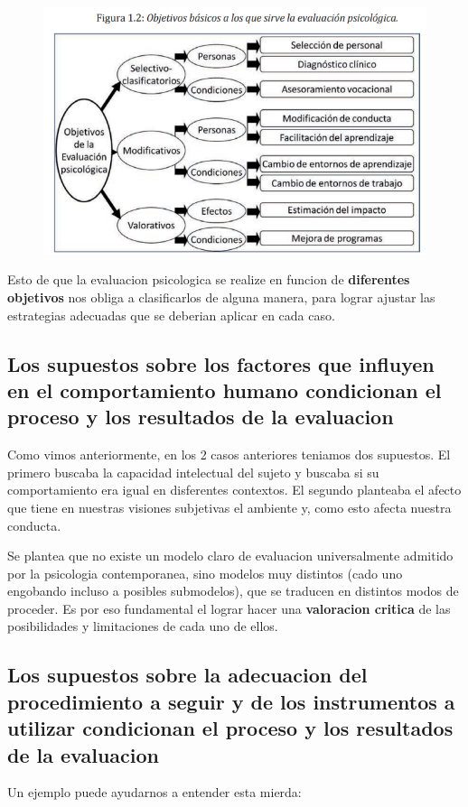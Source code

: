 \documentclass[12pt,a4paper]{article}
\begin{document}
\begin{figure}[!h!]
	\centering
		\includegraphics[width=0.6\linewidth]{objetivos.png}
	\label{fig:objetivos}
\end{figure}

Esto de que la evaluacion psicologica se realize en funcion de \textbf{diferentes objetivos} nos obliga a clasificarlos de alguna manera, para lograr ajustar las estrategias adecuadas que se deberian aplicar en cada caso. 

\subsection{Los supuestos sobre los factores que influyen en el comportamiento humano condicionan el proceso y los resultados de la evaluacion}%

Como vimos anteriormente, en los 2 casos anteriores teniamos dos supuestos. El primero buscaba la capacidad intelectual del sujeto y buscaba si su comportamiento era igual en disferentes contextos. El segundo planteaba el afecto que tiene en nuestras visiones subjetivas el ambiente y, como esto afecta nuestra conducta. 

Se plantea que no existe un modelo claro de evaluacion universalmente admitido por la psicologia contemporanea, sino modelos muy distintos (cado uno engobando incluso a posibles submodelos), que se traducen en distintos modos de proceder. Es por eso fundamental el lograr hacer una \textbf{valoracion critica} de las posibilidades y limitaciones de cada uno de ellos. 

\subsection{Los supuestos sobre la adecuacion del procedimiento a seguir y de los instrumentos a utilizar condicionan el proceso y los resultados de la evaluacion}%

Un ejemplo puede ayudarnos a entender esta mierda:
\end{document}
